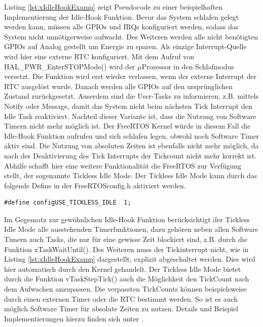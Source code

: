 Listing \ref{lst:xIdleHookExamp} zeigt Pseudocode zu einer beispielhaften Implementierung der Idle-Hook Funktion. Bevor das System schlafen gelegt werden kann, müssen alle GPIOs und IRQs konfiguriert werden, sodass das System nicht unnötigerweise aufwacht. Des Weiteren werden alle nicht benötigten GPIOs auf Analog gestellt um Energie zu sparen. Als einzige Interrupt-Quelle wird hier eine externe RTC konfiguriert. Mit dem Aufruf von HAL\_PWR\_EnterSTOPMode() wird der $\mu$\-Pro\-zesso\-r in den Schlafmodus versetzt. Die Funktion wird erst wieder verlassen, wenn der externe Interrupt der RTC ausgelöst wurde. Danach werden alle GPIOs auf den ursprünglichen Zustand zurückgesetzt. Auserdem sind die User-Tasks zu informieren, z.B. mittels Notify oder Message, damit das System nicht beim nächsten Tick Interrupt den Idle Task reaktiviert. Nachteil dieser Variante ist, dass die Nutzung von Software Timern nicht mehr möglich ist. Der FreeRTOS Kernel würde in diesem Fall die Idle-Hook Funktion aufrufen und sich schlafen legen, obwohl noch Software Timer aktiv sind. Die Nutzung von absoluten Zeiten ist ebenfalls nicht mehr möglich, da nach der Deaktivierung des Tick Interrupts der Tickcount nicht mehr korrekt ist. Abhilfe schafft hier eine weitere Funktionalität die FreeRTOS zur Verfügung stellt, der sogenannte Tickless Idle Mode. Der Tickless Idle Mode kann durch das folgende Define in der FreeRTOSconfig.h aktiviert werden.  
\begin{lstlisting}[label=lst:defineTicklessIdle, numbers = none]
#define configUSE_TICKLESS_IDLE  1; 
\end{lstlisting}
Im Gegensatz zur gewöhnlichen Idle-Hook Funktion be\-rück\-sich\-tigt der Tickless Idle Mode alle ausstehenden Timerfunktionen, dazu gehören neben allen Software Timern auch Tasks, die nur für eine gewisse Zeit blockiert sind, z.B. durch die Funktion xTaskWaitUntil(). Des Weiteren muss der Tickinterrupt nicht, wie in Listing \ref{lst:xIdleHookExamp} dargestellt, explizit abgeschaltet werden. Dies wird hier automatisch durch den Kernel gehandelt. Der Tickless Idle Mode bietet durch die Funktion vTaskStepTick() auch die Möglichkeit den TickCount nach dem Aufwachen anzupassen. Die verpassten TickCounts können beispielsweise durch einen externen Timer oder die RTC bestimmt werden. So ist es auch möglich Software Timer für absolute Zeiten zu nutzen. Details und Beispiel Implementierungen hierzu finden sich unter \cite{FreeRtosAdvanced}.  


